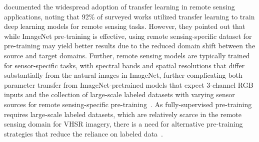 \citet{maTransferLearningEnvironmental2024} documented the widespread adoption of transfer learning in remote sensing applications, noting that \num{92}\% of surveyed works utilized transfer learning to train deep learning models for remote sensing tasks.
However, they pointed out that while ImageNet pre-training is effective, using remote sensing-specific dataset for pre-training may yield better results due to the reduced domain shift between the source and target domains.
Further, remote sensing models are typically trained for sensor-specific tasks, with spectral bands and spatial resolutions that differ substantially from the natural images in ImageNet, further complicating both parameter transfer from ImageNet-pretrained models that expect 3-channel RGB inputs and the collection of large-scale labeled datasets with varying sensor sources for remote sensing-specific pre-training~\citep{xieTransferLearningDeep2016}.
As fully-supervised pre-training requires large-scale labeled datasets, which are relatively scarce in the remote sensing domain for VHSR imagery, there is a need for alternative pre-training strategies that reduce the reliance on labeled data~\citep{bastaniSatlasPretrainLargeScaleDataset2023,manasSeasonalContrastUnsupervised2021a,jeanTile2VecUnsupervisedRepresentation2019}.

